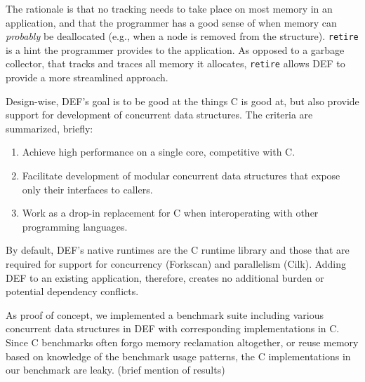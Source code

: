 The rationale is that no tracking needs to take place on most memory in an application, and that the programmer has a good sense of when memory can \textit{probably} be deallocated (e.g., when a node is removed from the structure).  \texttt{retire} is a hint the programmer provides to the application.  As opposed to a garbage collector, that tracks and traces all memory it allocates, \texttt{retire} allows DEF to provide a more streamlined approach.

Design-wise, DEF's goal is to be good at the things C is good at, but also provide support for development of concurrent data structures.  The criteria are summarized, briefly:

\begin{enumerate}
        \item Achieve high performance on a single core, competitive with C.
        \item Facilitate development of modular concurrent data structures that expose only their interfaces to callers.
        \item Work as a drop-in replacement for C when interoperating with other programming languages.
\end{enumerate}

By default, DEF's native runtimes are the C runtime library and those that are required for support for concurrency (Forkscan\cite{Forkscan}) and parallelism (Cilk\cite{BlumofeCilk}).  Adding DEF to an existing application, therefore, creates no additional burden or potential dependency conflicts.

As proof of concept, we implemented a benchmark suite including various concurrent data structures in DEF with corresponding implementations in C.  Since C benchmarks often forgo memory reclamation altogether, or reuse memory based on knowledge of the benchmark usage patterns,\cite{Synchrobench}\cite{Scal} the C implementations in our benchmark are leaky.  (brief mention of results)
